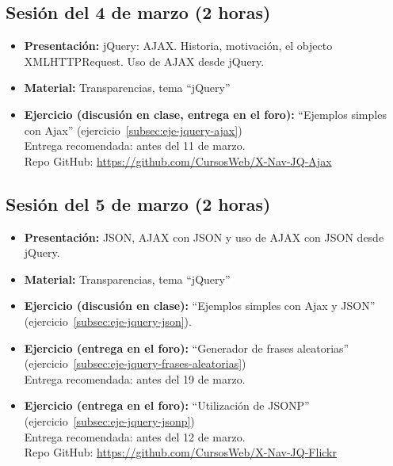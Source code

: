 \documentclass[a4paper,12pt]{report}
\begin{document}
\subsection{Sesión del 4 de marzo (2 horas)}

\begin{itemize}
\item \textbf{Presentación:} jQuery: AJAX. Historia, motivación, el objecto XMLHTTPRequest. Uso de AJAX desde jQuery.
\item \textbf{Material:} Transparencias, tema ``jQuery''
\item \textbf{Ejercicio (discusión en clase, entrega en el foro):} ``Ejemplos simples con Ajax'' (ejercicio~\ref{subsec:eje-jquery-ajax}) \\
  Entrega recomendada: antes del 11 de marzo. \\
  Repo GitHub: \url{https://github.com/CursosWeb/X-Nav-JQ-Ajax}
\end{itemize}

\subsection{Sesión del 5 de marzo (2 horas)}

\begin{itemize}
\item \textbf{Presentación:} JSON, AJAX con JSON y uso de AJAX con JSON desde jQuery.
\item \textbf{Material:} Transparencias, tema ``jQuery''
\item \textbf{Ejercicio (discusión en clase):} ``Ejemplos simples con Ajax y JSON'' (ejercicio~\ref{subsec:eje-jquery-json}).
\item \textbf{Ejercicio (entrega en el foro):} ``Generador de frases aleatorias'' (ejercicio~\ref{subsec:eje-jquery-frases-aleatorias}) \\
  Entrega recomendada: antes del 19 de marzo.
\item \textbf{Ejercicio (entrega en el foro):} ``Utilización de JSONP'' (ejercicio~\ref{subsec:eje-jquery-jsonp}) \\
  Entrega recomendada: antes del 12 de marzo. \\
  Repo GitHub: \url{https://github.com/CursosWeb/X-Nav-JQ-Flickr}
\end{itemize}


\end{document}
